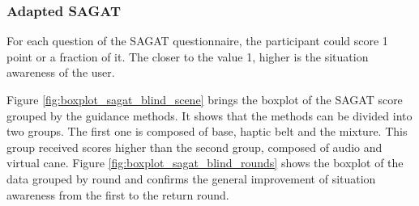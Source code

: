 \subsubsection{Adapted SAGAT}
\label{subsubsec:results_adapted_sagat_1}


For each question of the SAGAT questionnaire, the participant could score 1 point or a fraction of it. The closer to the value 1, higher is the situation awareness of the user. %

%


Figure \ref{fig:boxplot_sagat_blind_scene} brings the boxplot of the SAGAT score grouped by the guidance methods. It shows that the methods can be divided into two groups. The first one is composed of base, haptic belt and the mixture. This group received scores higher than the second group, composed of audio and virtual cane. Figure \ref{fig:boxplot_sagat_blind_rounds} shows the boxplot of the data grouped by round and confirms the general improvement of situation awareness from the first to the return round. 

